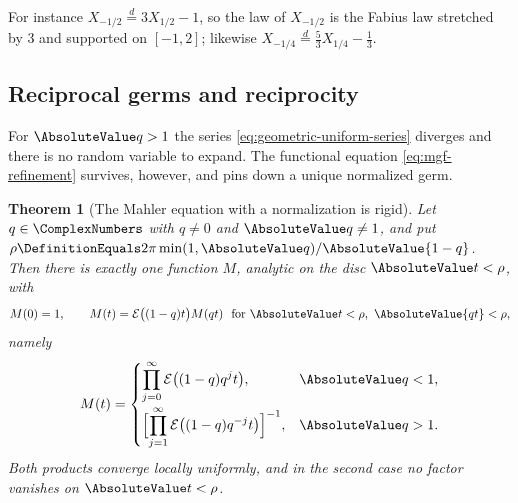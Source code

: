 \documentclass[11pt,a4paper,oneside,openany]{book}
\newtheorem{theorem}{Theorem}[chapter]
\theoremstyle{definition}
\theoremstyle{remark}
\begin{document}
For instance $X_{-1/2}\overset d=3X_{1/2}-1$, so the law of $X_{-1/2}$ is the
Fabius law stretched by $3$ and supported on $[-1,2]$; likewise
$X_{-1/4}\overset d=\tfrac53X_{1/4}-\tfrac13$.


\subsection{Reciprocal germs and reciprocity}

For $\AbsoluteValue q>1$ the series \eqref{eq:geometric-uniform-series} diverges and there
is no random variable to expand.  The functional equation \eqref{eq:mgf-refinement}
survives, however, and pins down a unique normalized germ.

\begin{theorem}[The Mahler equation with a normalization is rigid]\label{thm:qF-germ-uniqueness}
Let $q\in\ComplexNumbers$ with $q\ne0$ and $\AbsoluteValue q\ne1$, and put
$\rho\DefinitionEquals2\pi\min(1,\AbsoluteValue q)/\AbsoluteValue{1-q}$.  Then there is exactly one function
$M$, analytic on the disc $\AbsoluteValue t<\rho$, with
\begin{equation}\label{eq:qF-mahler-abstract}
 M(0)=1,
 \qquad
 M(t)=\mathcal E\bigl((1-q)t\bigr)M(qt)
 \ \text{ for }\AbsoluteValue t<\rho,\ \AbsoluteValue{qt}<\rho,
\end{equation}
namely
\begin{equation}\label{eq:qF-germ-def}
 M(t)=
 \begin{cases}
  \displaystyle\prod_{j=0}^{\infty}\mathcal E\bigl((1-q)q^{j}t\bigr),
  &\AbsoluteValue q<1,\\[12pt]
  \displaystyle\Bigl[\prod_{j=1}^{\infty}\mathcal E\bigl((1-q)q^{-j}t\bigr)\Bigr]^{-1},
  &\AbsoluteValue q>1.
 \end{cases}
\end{equation}
Both products converge locally uniformly, and in the second case no factor
vanishes on $\AbsoluteValue t<\rho$.
\end{theorem}
\end{document}
